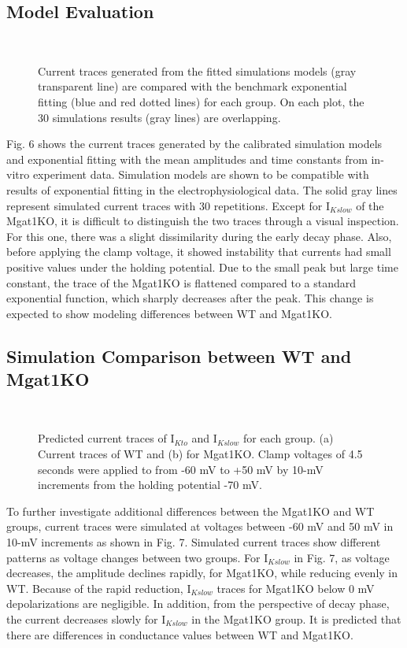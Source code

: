 \documentclass[journal]{IEEEtran}
\begin{document}
\subsection{Model Evaluation}
\begin{figure}
    \label{fig 6}
    \centering
    \\
    \caption{Current traces generated from the fitted simulations models (gray transparent line) are compared with the benchmark exponential fitting (blue and red dotted lines) for each group. On each plot, the 30 simulations results (gray lines) are overlapping.}
\end{figure}
Fig. 6 shows the current traces generated by the calibrated simulation models and exponential fitting with the mean amplitudes and time constants from in-vitro experiment data. Simulation models are shown to be compatible with results of exponential fitting in the electrophysiological data. The solid gray lines represent simulated current traces with 30 repetitions. Except for $\text{I}_{Kslow}$ of the Mgat1KO, it is difficult to distinguish the two traces through a visual inspection. For this one, there was a slight dissimilarity during the early decay phase. Also, before applying the clamp voltage, it showed instability that currents had small positive values under the holding potential. Due to the small peak but large time constant, the trace of the Mgat1KO is flattened compared to a standard exponential function, which sharply decreases after the peak. This change is expected to show modeling differences between WT and Mgat1KO.

\subsection{Simulation Comparison between WT and Mgat1KO}
\begin{figure}
    \label{fig 7}
    \centering
    \\
    \caption{Predicted current traces of $\text{I}_{Kto}$ and $\text{I}_{Kslow}$ for each group. (a) Current traces of WT and (b) for Mgat1KO. Clamp voltages of 4.5 seconds were applied to from -60 mV to +50 mV by 10-mV increments from the holding potential -70 mV.}
\end{figure}
To further investigate additional differences between the Mgat1KO and WT groups, current traces were simulated at voltages between -60 mV and 50 mV in 10-mV increments as shown in Fig. 7. Simulated current traces show different patterns as voltage changes between two groups. For $\text{I}_{Kslow}$ in Fig. 7, as voltage decreases, the amplitude declines rapidly, for Mgat1KO, while reducing evenly in WT. Because of the rapid reduction, $\text{I}_{Kslow}$ traces for Mgat1KO below 0 mV depolarizations are negligible. In addition, from the perspective of decay phase, the current decreases slowly for $\text{I}_{Kslow}$ in the Mgat1KO group. It is predicted that there are differences in conductance values between WT and Mgat1KO.
\end{document}
